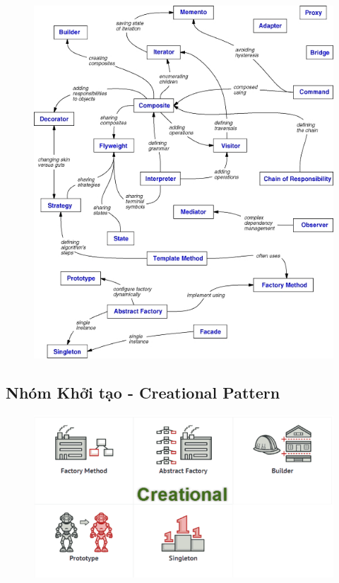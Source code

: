 \documentclass{article}
\begin{document}
\begin{itemize}
\begin{figure}[htp]
\begin{center}
                \includegraphics[scale=0.65]{./image/design-patterns-relationship.jpg}
            \end{center}
        \end{figure}
    \end{itemize}
    \pagebreak
    \begin{center}
        \hspace{0pt}
        \vfill
        \part{Nhóm Khởi tạo - Creational Pattern}
        \begin{figure}[htp]
            \begin{center}
                \includegraphics[scale=0.65]{./image/creational-pattern.png}
            \end{center}
        \end{figure}
        \vfill
        \hspace{0pt}
    \end{center}
\end{document}
